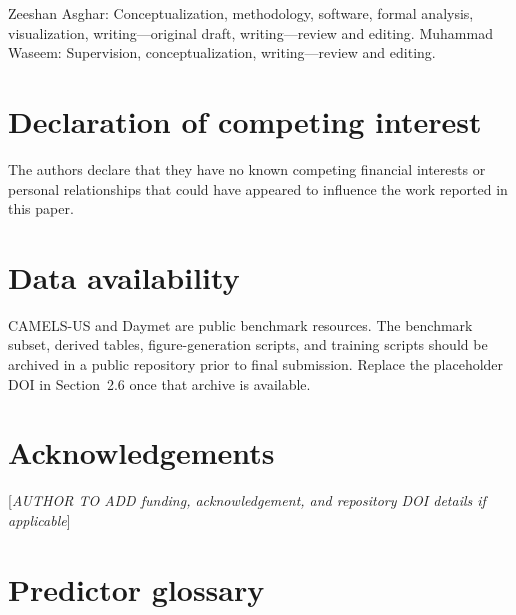 \documentclass[preprint,12pt,authoryear]{elsarticle}
\begin{document}
Zeeshan Asghar: Conceptualization, methodology, software, formal analysis, visualization, writing---original draft, writing---review and editing. Muhammad Waseem: Supervision, conceptualization, writing---review and editing.

\section*{Declaration of competing interest}

The authors declare that they have no known competing financial interests or personal relationships that could have appeared to influence the work reported in this paper.

\section*{Data availability}

CAMELS-US and Daymet are public benchmark resources. The benchmark subset, derived tables, figure-generation scripts, and training scripts should be archived in a public repository prior to final submission. Replace the placeholder DOI in Section~2.6 once that archive is available.

\section*{Acknowledgements}

[\textit{AUTHOR TO ADD funding, acknowledgement, and repository DOI details if applicable}]

\appendix

\section{Predictor glossary}
\end{document}
